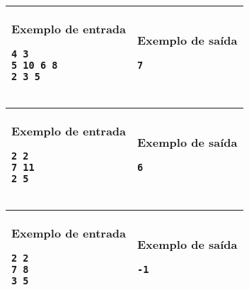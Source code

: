 \newpage
\begin{table}[!h]
\centering
\begin{tabular}{|l|l|}
\hline
\begin{minipage}[t]{3in}
\textbf{Exemplo de entrada}
\begin{verbatim}
4 3
5 10 6 8
2 3 5
\end{verbatim}
\vspace{1mm}
\end{minipage}
&
\begin{minipage}[t]{3in}
\textbf{Exemplo de saída}
\begin{verbatim}
7
\end{verbatim}
\vspace{1mm}
\end{minipage} \\
\hline
\end{tabular}
\end{table}

\begin{table}[!h]
\centering
\begin{tabular}{|l|l|}
\hline
\begin{minipage}[t]{3in}
\textbf{Exemplo de entrada}
\begin{verbatim}
2 2
7 11
2 5
\end{verbatim}
\vspace{1mm}
\end{minipage}
&
\begin{minipage}[t]{3in}
\textbf{Exemplo de saída}
\begin{verbatim}
6
\end{verbatim}
\vspace{1mm}
\end{minipage} \\
\hline
\end{tabular}
\end{table}


\begin{table}[!h]
\centering
\begin{tabular}{|l|l|}
\hline
\begin{minipage}[t]{3in}
\textbf{Exemplo de entrada}
\begin{verbatim}
2 2
7 8
3 5
\end{verbatim}
\vspace{1mm}
\end{minipage}
&
\begin{minipage}[t]{3in}
\textbf{Exemplo de saída}
\begin{verbatim}
-1
\end{verbatim}
\vspace{1mm}
\end{minipage} \\
\hline
\end{tabular}
\end{table}
